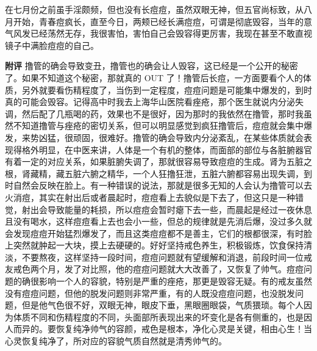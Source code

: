 \begin{case}
    在七月份之前虽手淫颇频，但也没有长痘痘，虽然双眼无神，但五官尚标致，从八月开始，青春痘疯长，直至今日，两颊已经长满痘痘，可谓是彻底毁容，当年的意气风发已经荡然无存，我很害怕，害怕自己会毁容得更厉害，我现在甚至不敢直视镜子中满脸痘痘的自己。

    \textbf{附评} 撸管的确会导致变丑，撸管也的确会让人毁容，这已经是一个公开的秘密了。如果不知道这个秘密，那就真的 OUT 了！撸管后长痘，一方面要看个人的体质，另外就要看伤精程度了，当伤到一定程度，痘痘问题是可能集中爆发的，到时真的可能会毁容。记得高中时我去上海华山医院看痤疮，那个医生就说内分泌失调，然后配了几瓶喝的药，效果也不是很好，因为那时的我依然在撸管，那时我虽然不知道撸管与痤疮的密切关系，但可以明显感觉到疯狂撸管后，痘痘就会集中爆发，来势凶猛，很顽固，很难好。撸管的确会导致内分泌紊乱，在某些体质就会表现得格外明显，在中医来讲，人体是一个有机的整体，而面部的部位与各脏腑器官有着一定的对应关系，如果脏腑失调了，那就很容易导致痘痘的生成。肾为五脏之根，肾藏精，藏五脏六腑之精华，一个人狂撸狂泄，五脏六腑都容易出现失调，到时自然会反映在脸上。有一种错误的说法，那就是很多无知的人会认为撸管可以去火消痘，其实在射出后或者晨起时，痘痘看上去貌似是下去了，但这只是一种错觉，射出会导致能量的耗损，所以痘痘会暂时瘪下去一些，而晨起是经过一夜休息且没有喝水，这样痘痘看上去也会小一些，但总的规律就是先消后爆，没过多久就会发现痘痘开始猛烈爆发了，而且这类痘痘都不是善主，它们的根都很深，有时脸上突然就肿起一大块，摸上去硬硬的。好好坚持戒色养生，积极锻炼，饮食保持清淡，不要熬夜，这样坚持一段时间，痘痘问题就有望缓解和消退，前段时间一位戒友戒色两个月，发了对比照，他的痘痘问题就大大改善了，又恢复了帅气。痘痘问题的确很影响一个人的容貌，特别是严重的痤疮，那更是毁容无疑。有的戒友虽然没有痘痘问题，但他的脱发问题则非常严重，有的人既没痘痘问题，也没脱发问题，但是他气色很不好，双眼无神，眼皮下垂，黑眼圈眼袋，气质猥琐。每个人因为体质不同和伤精程度的不同，头面部所表现出来的坏变化是各有侧重的，也是因人而异的。要恢复纯净帅气的容颜，戒色是根本，净化心灵是关键，相由心生！当心灵恢复纯净了，所对应的容貌气质自然就是清秀帅气的。
\end{case}


